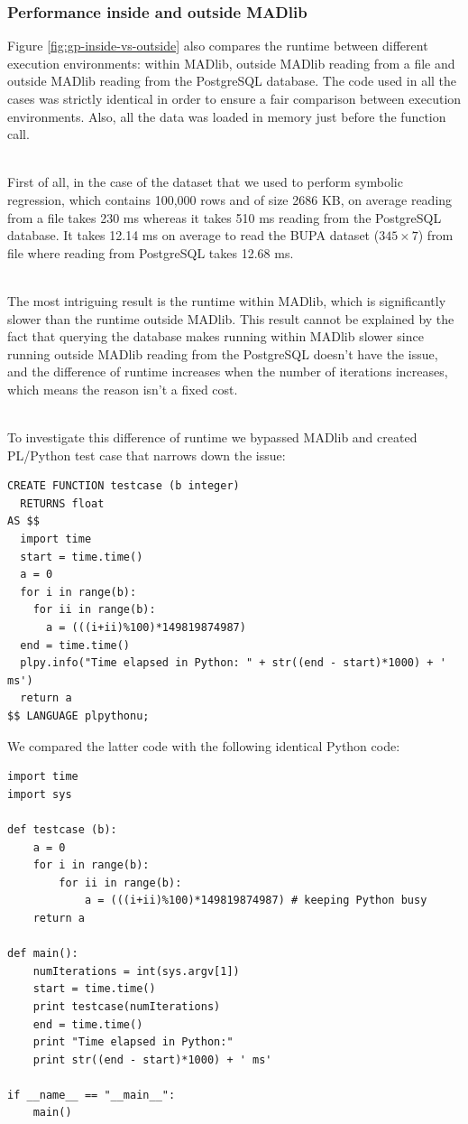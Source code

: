 \subsubsection*{Performance inside and outside MADlib}
Figure \ref{fig:gp-inside-vs-outside} also compares the runtime between different execution environments: within MADlib, outside MADlib reading from a file and outside MADlib reading from the PostgreSQL database. The code used in all the cases was strictly identical in order to ensure a fair comparison between execution environments. Also, all the data was loaded in memory just before the function call.

~~\\
First of all, in the case of the dataset that we used to perform symbolic regression, which contains 100,000 rows and of size 2686 KB, on average reading from a file takes 230 ms whereas it takes 510 ms reading from the PostgreSQL database. It takes 12.14 ms on average to read the BUPA dataset ($345\times7$) from file where reading from PostgreSQL takes 12.68 ms.

~~\\
The most intriguing result is the runtime within MADlib, which is significantly slower than the runtime outside MADlib. This result cannot be explained by the fact that querying the database makes running within MADlib slower since running outside MADlib reading from the PostgreSQL doesn't have the issue, and the difference of runtime increases when the number of iterations increases, which means the reason isn't a fixed cost.

~~\\
To investigate this difference of runtime we bypassed MADlib and created PL/Python test case that narrows down the issue:

\begin{verbatim}
CREATE FUNCTION testcase (b integer)
  RETURNS float
AS $$
  import time
  start = time.time()
  a = 0
  for i in range(b):
    for ii in range(b):
      a = (((i+ii)%100)*149819874987)
  end = time.time()
  plpy.info("Time elapsed in Python: " + str((end - start)*1000) + ' ms')
  return a
$$ LANGUAGE plpythonu;
\end{verbatim}

We compared the latter code with the following identical Python code:
\begin{verbatim}
import time
import sys

def testcase (b):     
    a = 0
    for i in range(b):
        for ii in range(b):
            a = (((i+ii)%100)*149819874987) # keeping Python busy
    return a

def main():    
    numIterations = int(sys.argv[1])        
    start = time.time()
    print testcase(numIterations)
    end = time.time()
    print "Time elapsed in Python:"
    print str((end - start)*1000) + ' ms'        

if __name__ == "__main__":
    main()
\end{verbatim}

